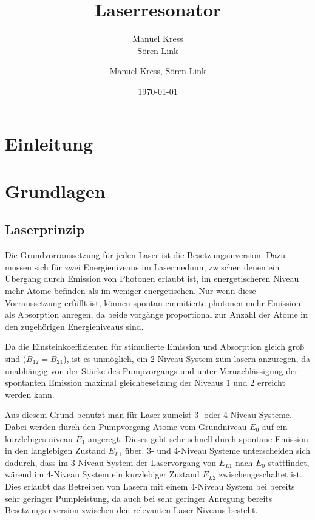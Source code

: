 \documentclass[bigchapter,colorback,accentcolor=tud4b,linedtoc,11pt]{tudreport}
\title{Laserresonator}
\subtitle{Manuel Kress  \\Sören Link}
\author{Manuel Kress, Sören Link}
\date{\today}
\numberwithin{equation}{subsection}
\begin{document}

\maketitle

\tableofcontents


\chapter{Einleitung}

\chapter{Grundlagen}
\section{Laserprinzip}
Die Grundvorraussetzung für jeden Laser ist die Besetzungsinversion. Dazu müssen sich für zwei Energieniveaus im Lasermedium, zwischen denen ein Übergang durch Emission von Photonen erlaubt ist, im energetischeren Niveau mehr Atome befinden als im weniger energetischen. Nur wenn diese Vorraussetzung erfüllt ist, können spontan emmitierte photonen mehr Emission als Absorption anregen, da beide vorgänge proportional zur Anzahl der Atome in den zugehörigen Energieniveaus sind.

Da die Einsteinkoeffizienten für stimulierte Emission und Absorption gleich groß sind ($B_{12}=B_{21}$), ist es unmöglich, ein 2-Niveau System zum lasern anzuregen, da unabhängig von der Stärke des Pumpvorgangs und unter Vernachlässigung der spontanten Emission maximal gleichbesetzung der Niveaus 1 und 2 erreicht werden kann.

Aus diesem Grund benutzt man für Laser zumeist 3- oder 4-Niveau Systeme. Dabei werden durch den Pumpvorgang Atome vom Grundniveau $E_0$ auf ein kurzlebiges niveau $E_1$ angeregt. Dieses geht sehr schnell durch spontane Emission in den langlebigen Zustand $E_{L1}$ über. 3- und 4-Niveau Systeme unterscheiden sich dadurch, dass im 3-Niveau System der Laservorgang von $E_{L1}$ nach $E_{0}$ stattfindet, wärend im 4-Niveau System ein kurzlebiger Zustand $E_{L2}$ zwischengeschaltet ist. Dies erlaubt das Betreiben von Lasern mit einem 4-Niveau System bei bereits sehr geringer Pumpleistung, da auch bei sehr geringer Anregung bereits Besetzungsinversion zwischen den relevanten Laser-Niveaus besteht.
\end{document}

